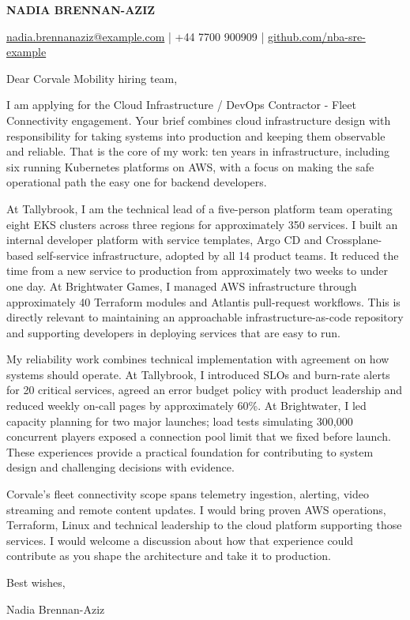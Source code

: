 \documentclass[11pt,a4paper]{article}
\begin{document}
{\Large\bfseries\color{primarycolor} NADIA BRENNAN-AZIZ}\par
{\small \href{mailto:nadia.brennanaziz@example.com}{nadia.brennanaziz@example.com} | +44 7700 900909 | \href{https://github.com/nba-sre-example}{github.com/nba-sre-example}}\par

Dear Corvale Mobility hiring team,

I am applying for the Cloud Infrastructure / DevOps Contractor - Fleet Connectivity engagement. Your brief combines cloud infrastructure design with responsibility for taking systems into production and keeping them observable and reliable. That is the core of my work: ten years in infrastructure, including six running Kubernetes platforms on AWS, with a focus on making the safe operational path the easy one for backend developers.

At Tallybrook, I am the technical lead of a five-person platform team operating eight EKS clusters across three regions for approximately 350 services. I built an internal developer platform with service templates, Argo CD and Crossplane-based self-service infrastructure, adopted by all 14 product teams. It reduced the time from a new service to production from approximately two weeks to under one day. At Brightwater Games, I managed AWS infrastructure through approximately 40 Terraform modules and Atlantis pull-request workflows. This is directly relevant to maintaining an approachable infrastructure-as-code repository and supporting developers in deploying services that are easy to run.

My reliability work combines technical implementation with agreement on how systems should operate. At Tallybrook, I introduced SLOs and burn-rate alerts for 20 critical services, agreed an error budget policy with product leadership and reduced weekly on-call pages by approximately 60\%. At Brightwater, I led capacity planning for two major launches; load tests simulating 300,000 concurrent players exposed a connection pool limit that we fixed before launch. These experiences provide a practical foundation for contributing to system design and challenging decisions with evidence.

Corvale's fleet connectivity scope spans telemetry ingestion, alerting, video streaming and remote content updates. I would bring proven AWS operations, Terraform, Linux and technical leadership to the cloud platform supporting those services. I would welcome a discussion about how that experience could contribute as you shape the architecture and take it to production.

Best wishes,\par
Nadia Brennan-Aziz
\end{document}
